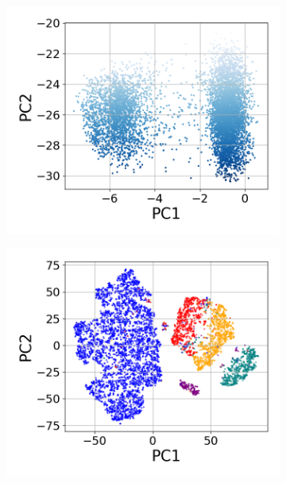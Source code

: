\documentclass{article} %
\begin{document}
\begin{figure}[t]
\begin{subfigure}{0.182\textwidth}
    \includegraphics[width=\linewidth]{images/pca-components-entropy.png}
    \caption{}
\end{subfigure}\hfill
\begin{subfigure}{0.182\textwidth}
    \includegraphics[width=\linewidth]{images/tsne-components.png}
    \caption{}
\end{subfigure}\hfill
\begin{subfigure}{0.182\textwidth}

\end{subfigure}
\end{figure}
\end{document}
